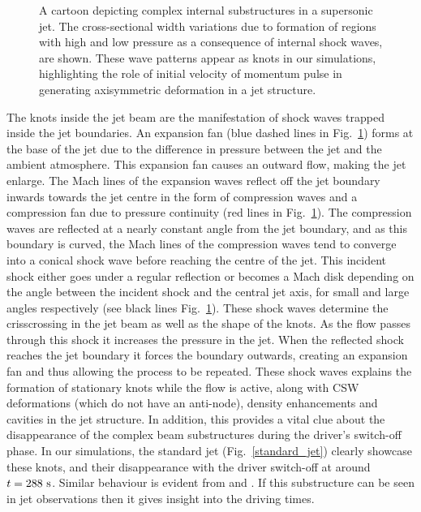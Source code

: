 %
\begin{figure}
\captionsetup[subfigure]{labelformat=empty}
\centering
{}
\caption{A cartoon depicting complex internal substructures in a supersonic jet. The cross-sectional width variations due to formation of regions with high and low pressure as a consequence of internal shock waves, are shown. These wave patterns appear as knots in our simulations, highlighting the role of initial velocity of momentum pulse in generating axisymmetric deformation in a jet structure. }
\label{cartoon_jet_waves}
\end{figure}
The knots inside the jet beam are the manifestation of shock waves trapped inside the jet boundaries. An expansion fan (blue dashed lines in Fig.~\ref{cartoon_jet_waves}) forms at the base of the jet due to the difference in pressure between the jet and the ambient atmosphere. This expansion fan causes an outward flow, making the jet enlarge. The Mach lines of the expansion waves reflect off the jet boundary inwards towards the jet centre in the form of compression waves and a compression fan due to pressure continuity (red lines in Fig.~\ref{cartoon_jet_waves}). The compression waves are reflected at a nearly constant angle from the jet boundary, and as this boundary is curved, the Mach lines of the compression waves tend to converge into a conical shock wave before reaching the centre of the jet. This incident shock either goes under a regular reflection or becomes a Mach disk depending on the angle between the incident shock and the central jet axis, for small and large angles respectively (see black lines Fig.~\ref{cartoon_jet_waves}). These shock waves determine the crisscrossing in the jet beam as well as the shape of the knots. As the flow passes through this shock it increases the pressure in the jet. When the reflected shock reaches the jet boundary it forces the boundary outwards, creating an expansion fan and thus allowing the process to be repeated. \np
%
These shock waves explains the formation of stationary knots while the flow is active, along with CSW deformations (which do not have an anti-node), density enhancements and cavities in the jet structure. In addition, this provides a vital clue about the disappearance of the complex beam substructures during the driver’s switch-off phase. In our simulations, the standard jet (Fig.~\ref{standard_jet}) clearly showcase these knots, and their disappearance with the driver switch-off at around $t=288~\rm{s}$. Similar behaviour is evident from  and . If this substructure can be seen in jet observations then it gives insight into the driving times.
